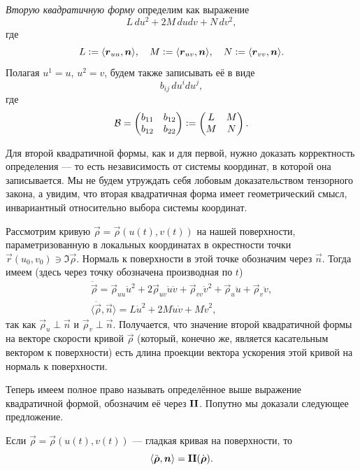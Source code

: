 \begin{definition}
	\textit{Вторую квадратичную форму} определим как выражение
	\[
		L\,du^2 + 2M\,dudv + N\,dv^2,
	\]
	где
	\[
		L \vcentcolon = \langle\vec{r}_{uu}, \vec{n}\rangle,\quad M \vcentcolon = \langle\vec{r}_{uv}, \vec{n}\rangle,\quad N \vcentcolon = \langle\vec{r}_{vv}, \vec{n}\rangle.
	\]
	Полагая $u^1 = u$, $u^2 = v$, будем также записывать её в виде
	\[
		b_{ij}\,du^idu^j,
	\]
	где
	\[
		\B = \begin{pmatrix}
			b_{11} & b_{12}\\
			b_{12} & b_{22}
		\end{pmatrix} \vcentcolon =
		\begin{pmatrix}
			L & M\\
			M & N
		\end{pmatrix}.
	\]
\end{definition}

Для второй квадратичной формы, как и для первой, нужно доказать корректность определения --- то есть независимость от системы координат, в которой она записывается. Мы не будем утруждать себя лобовым доказательством тензорного закона, а увидим, что вторая квадратичная форма имеет геометрический смысл, инвариантный относительно выбора системы координат.

Рассмотрим кривую $\vec{\rho} = \vec{\rho}(u(t), v(t))$ на нашей поверхности, параметризованную в локальных координатах в окрестности точки $\vec{r}(u_0, v_0) \ni \Im\vec{\rho}$. Нормаль к поверхности в этой точке обозначим через $\vec{n}$. Тогда имеем (здесь через точку обозначена производная по $t$)
\begin{gather*}
	\ddot{\vec{\rho}} = \vec{\rho}_{uu}\dot{u}^2 + 2\vec{\rho}_{uv}\dot{u}\dot{v} + \vec{\rho}_{vv}\dot{v}^2 + \vec{\rho}_u\ddot{u} + \vec{\rho}_v\ddot{v},\\
	\langle\ddot{\vec{\rho}}, \vec{n}\rangle = L\dot{u}^2 + 2M\dot{u}\dot{v} + M\dot{v}^2,
\end{gather*}
так как $\vec{\rho}_u \perp \vec{n}$ и $\vec{\rho}_v \perp \vec{n}$. Получается, что значение второй квадратичной формы на векторе скорости кривой $\vec{\rho}$ (который, конечно же, является касательным вектором к поверхности) есть длина проекции вектора ускорения этой кривой на нормаль к поверхности.

Теперь имеем полное право называть определённое выше выражение квадратичной формой, обозначим её через $\II$. Попутно мы доказали следующее предложение.

\begin{proposition} \label{proposition:GeomII}
	Если $\vec{\rho} = \vec{\rho}(u(t), v(t))$ --- гладкая кривая на поверхности, то
	\[
		\langle\ddot{\vec{\rho}}, \vec{n}\rangle = \II(\dot{\vec{\rho}}).
	\]
\end{proposition}

